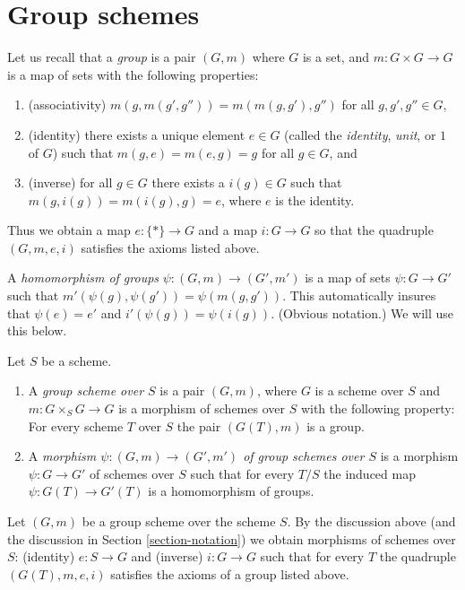 \section{Group schemes}
\label{section-group-schemes}

\noindent
Let us recall that a {\it group} is a pair
$(G, m)$ where $G$ is a set, and $m : G \times G \to G$ is
a map of sets with the following properties:
\begin{enumerate}
\item (associativity) $m(g, m(g', g'')) = m(m(g, g'), g'')$
for all $g, g', g'' \in G$,
\item (identity) there exists a unique element $e \in G$
(called the {\it identity}, {\it unit}, or $1$ of $G$) such that
$m(g, e) = m(e, g) = g$ for all $g \in G$, and
\item (inverse) for all $g \in G$ there exists a $i(g) \in G$
such that $m(g, i(g)) = m(i(g), g) = e$, where $e$ is the
identity.
\end{enumerate}
Thus we obtain a map $e : \{*\} \to G$ and a map
$i : G \to G$ so that the quadruple $(G, m, e, i)$
satisfies the axioms listed above.

\medskip\noindent
A {\it homomorphism of groups} $\psi : (G, m) \to (G', m')$
is a map of sets $\psi : G \to G'$ such that
$m'(\psi(g), \psi(g')) = \psi(m(g, g'))$. This automatically
insures that $\psi(e) = e'$ and $i'(\psi(g)) = \psi(i(g))$.
(Obvious notation.) We will use this below.

\begin{definition}
\label{definition-group-scheme}
Let $S$ be a scheme.
\begin{enumerate}
\item A {\it group scheme over $S$} is a pair $(G, m)$, where
$G$ is a scheme over $S$ and $m : G \times_S G \to G$ is
a morphism of schemes over $S$ with the following property:
For every scheme $T$ over $S$ the pair $(G(T), m)$
is a group.
\item A {\it morphism $\psi : (G, m) \to (G', m')$ of group schemes over $S$}
is a morphism $\psi : G \to G'$ of schemes over $S$ such that for
every $T/S$ the induced map $\psi : G(T) \to G'(T)$ is a homomorphism
of groups.
\end{enumerate}
\end{definition}

\noindent
Let $(G, m)$ be a group scheme over the scheme $S$.
By the discussion above (and the discussion in Section \ref{section-notation})
we obtain morphisms of schemes over $S$:
(identity) $e : S \to G$ and (inverse) $i : G \to G$ such that
for every $T$ the quadruple $(G(T), m, e, i)$ satisfies the
axioms of a group listed above.

